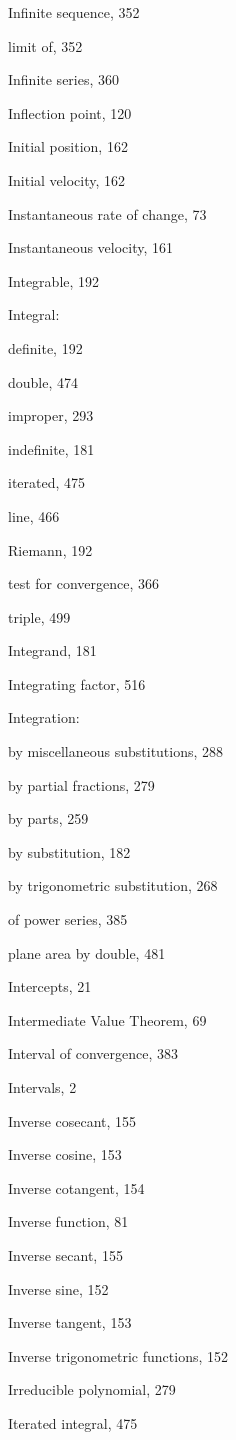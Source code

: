 \documentclass[10pt]{article}
\begin{document}
Infinite sequence, 352

limit of, 352

Infinite series, 360

Inflection point, 120

Initial position, 162

Initial velocity, 162

Instantaneous rate of change, 73

Instantaneous velocity, 161

Integrable, 192

Integral:

definite, 192

double, 474

improper, 293

indefinite, 181

iterated, 475

line, 466

Riemann, 192

test for convergence, 366

triple, 499

Integrand, 181

Integrating factor, 516

Integration:

by miscellaneous substitutions, 288

by partial fractions, 279

by parts, 259

by substitution, 182

by trigonometric substitution, 268

of power series, 385

plane area by double, 481

Intercepts, 21

Intermediate Value Theorem, 69

Interval of convergence, 383

Intervals, 2

Inverse cosecant, 155

Inverse cosine, 153

Inverse cotangent, 154

Inverse function, 81

Inverse secant, 155

Inverse sine, 152

Inverse tangent, 153

Inverse trigonometric functions, 152

Irreducible polynomial, 279

Iterated integral, 475
\end{document}
